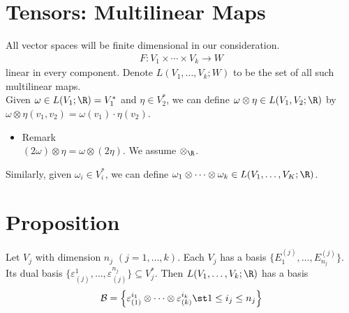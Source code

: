 \documentclass[11pt]{article}
\begin{document}
\section*{Tensors: Multilinear Maps}
\label{sec:org48fa8ef}
All vector spaces will be finite dimensional in our consideration.\\
\begin{align*}
  F:V_{1}\times\cdots\times V_{k}\to W
\end{align*}
linear in every component. Denote \(L(V_{1},\ldots,V_{k};W)\) to be the set of all such multilinear maps.\\
Given \(\omega\in L(V_{1};\R)=V_{1}^{*}\) and \(\eta\in V^{*}_{2}\), we can define \(\omega\otimes\eta\in L(V_{1},V_{2};\R)\) by \(\omega\otimes\eta(v_{1},v_{2})=\omega(v_{1})\cdot\eta(v_{2})\).\\
\begin{itemize}
\item Remark\\

\((2\omega)\otimes\eta=\omega\otimes(2\eta)\). We assume \(\otimes_{\R}\).\\
\end{itemize}

Similarly, given \(\omega_{i}\in V_{i}^{*}\), we can define \(\omega_{1}\otimes\cdots\otimes\omega_{k}\in L(V_{1},\ldots, V_{K};\R)\).\\
\section*{Proposition}
\label{sec:org696a115}
Let \(V_{j}\) with dimension \(n_{j}\) \((j=1,\ldots,k)\). Each \(V_{j}\) has a basis \(\{E_{1}^{(j)},\ldots,E_{n_{j}}^{(j)}\}\).\\
Its dual basis \(\{\varepsilon_{(j)}^{1},\ldots,\varepsilon_{(j)}^{n_{j}}\}\subseteq V^{*}_{j}\). Then \(L(V_{1},\dots,V_{k};\R)\) has a basis\\
\begin{align*}
  \mathcal{B}
  =\left\{ \varepsilon_{(1)}^{i_{1}}\otimes\cdots\otimes\varepsilon_{(k)}^{i_{k}}\st 1\leq i_{j}\leq n_{j} \right\}
\end{align*}
\end{document}
